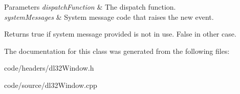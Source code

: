 \begin{DoxyParams}{Parameters}
{\em dispatch\-Function} & The dispatch function. \\
\hline
{\em system\-Messages} & System message code that raises the new event.\\
\hline
\end{DoxyParams}
\begin{DoxyReturn}{Returns}
true if system message provided is not in use. False in other case. 
\end{DoxyReturn}


The documentation for this class was generated from the following files\-:\begin{DoxyCompactItemize}
\item 
code/headers/dl32\-Window.\-h\item 
code/source/dl32\-Window.\-cpp\end{DoxyCompactItemize}
